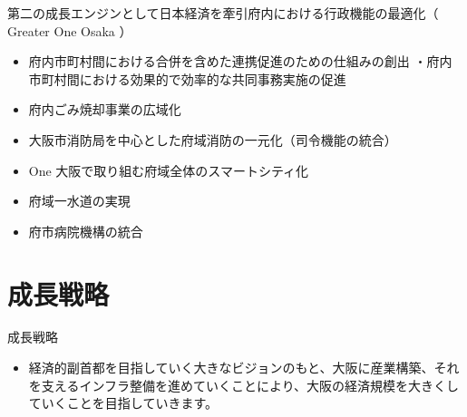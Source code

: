 \documentclass[dvipdfmx]{beamer}
\begin{document}
    \begin{frame}{第二の成長エンジンとして日本経済を牽引}{府内における行政機能の最適化（ Greater One Osaka ）}
        \begin{small}
            \begin{itemize}
                \setlength{\itemsep}{2mm}
                \item \alert{府内市町村間における合併を含めた連携促進のための仕組みの創出 ・府内市町村間における効果的で効率的な共同事務実施の促進}
                \item \alert{府内ごみ焼却事業の広域化}
                \item \alert{大阪市消防局を中心とした府域消防の一元化（司令機能の統合）}
                \item \alert{One 大阪で取り組む府域全体のスマートシティ化}
                \item 府域一水道の実現
                \item 府市病院機構の統合
            \end{itemize}
        \end{small}
    \end{frame}

\section{成長戦略}
    \begin{frame}
        \sectionpage
    \end{frame}

    \begin{frame}{成長戦略}{}
        \begin{small}
            \begin{itemize}
                \setlength{\itemsep}{2mm}
                \item 経済的副首都を目指していく大きなビジョンのもと、大阪に産業構築、それを支えるインフラ整備を進めていくことにより、大阪の経済規模を大きくしていくことを目指していきます。
            \end{itemize}
        \end{small}
    \end{frame}
\end{document}
